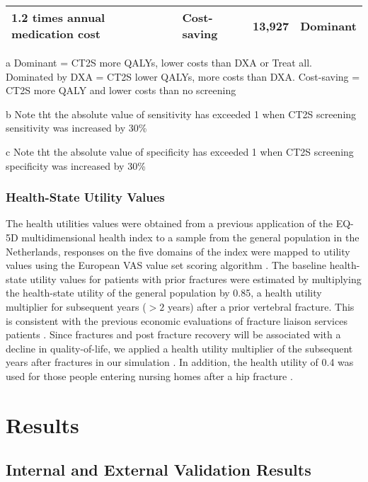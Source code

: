 \begin{center}
{\begin{longtable}{m{6cm}m{2cm}<{\centering}m{2.3cm}<{\centering}m{1.8cm}<{\centering}}
1.2 times annual medication cost & Cost-saving & 13,927 & Dominant\\
\bottomrule
\end{longtable}}
\begin{tablenotes}
\footnotesize
\item[a] Dominant = CT2S more QALYs, lower costs than DXA or Treat all. Dominated by DXA =  CT2S lower QALYs, more costs than DXA.  Cost-saving = CT2S more QALY and lower costs than no screening
\item[b] \dag Note tht the absolute value of sensitivity has exceeded 1 when CT2S screening sensitivity was increased by 30\%
\item[c] \dag\dag Note tht the absolute value of specificity has exceeded 1 when CT2S screening specificity was increased by 30\%
\end{tablenotes}
\end{center}

\subsubsection{Health-State Utility Values}

The health utilities values were obtained from a previous application of the EQ-5D multidimensional health index to a sample from the general population in the Netherlands, responses on the five domains of the index were mapped to utility values using the European VAS value set scoring algorithm \cite{4-72}. The baseline health-state utility values for patients with prior fractures were estimated by multiplying the health-state utility of the general population by 0.85, a health utility multiplier for subsequent years ($> 2$ years) after a prior vertebral fracture. This is consistent with the previous economic evaluations of fracture liaison services patients \cite{4-52}. Since fractures and post fracture recovery will be associated with a decline in quality-of-life, we applied a health utility multiplier of the subsequent years after fractures in our simulation \cite{4-73}. In addition, the health utility of 0.4 was used for those people entering nursing homes after a hip fracture \cite{4-74}.

\section{Results}
\subsection{Internal and External Validation Results}

